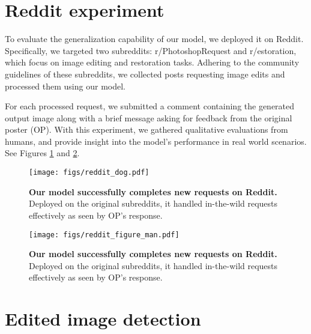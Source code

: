 
\section{Reddit experiment}

To evaluate the generalization capability of our model, we deployed it on Reddit. Specifically, we targeted two subreddits: r/PhotoshopRequest and r/estoration, which focus on image editing and restoration tasks. Adhering to the community guidelines of these subreddits, we collected posts requesting image edits and processed them using our model.

For each processed request, we submitted a comment containing the generated output image along with a brief message asking for feedback from the original poster (OP). With this experiment, we gathered qualitative evaluations from humans, and provide insight into the model's performance in real world scenarios. See Figures \ref{fig:reddit_dog}
and \ref{fig:reddit_man}.  
\begin{figure}[h]
    \centering
    \texttt{[image: figs/reddit\_dog.pdf]}
    \caption{\textbf{Our model successfully completes new requests on Reddit.} Deployed on the original subreddits, it handled in-the-wild requests effectively as seen by OP's response.}
    \label{fig:reddit_dog}
\end{figure}

\begin{figure}[h]
    \centering
    \texttt{[image: figs/reddit\_figure\_man.pdf]}
    \caption{\textbf{Our model successfully completes new requests on Reddit.} Deployed on the original subreddits, it handled in-the-wild requests effectively as seen by OP's response.}
    \label{fig:reddit_man}
\end{figure}

\clearpage
\section{Edited image detection}




